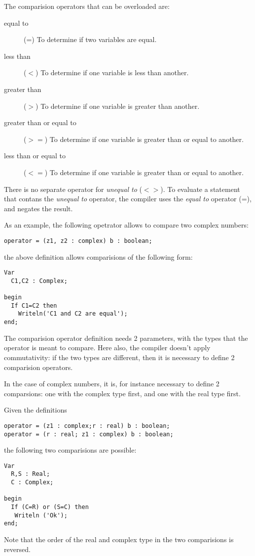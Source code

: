 The comparision operators that can be overloaded are:
\begin{description}
\item[equal to] (=) To determine if two variables are equal.
\item[less than] ($<$) To determine if one variable is less than another.
\item[greater than] ($>$) To determine if one variable is greater than another.
\item[greater than or equal to] ($>=$) To determine if one variable is greater than
or equal to another.
\item[less than or equal to] ($<=$) To determine if one variable is greater
than or equal to another.
\end{description}
There is no separate operator for {\em unequal to} ($<>$). To evaluate a
statement that contans the {\em unequal to} operator, the compiler uses the
{\em equal to} operator (=), and negates the result.


As an example, the following opetrator allows to compare two complex
numbers:
\begin{verbatim}
operator = (z1, z2 : complex) b : boolean;
\end{verbatim}
the above definition allows comparisions of the following form:
\begin{verbatim}
Var
  C1,C2 : Complex;

begin
  If C1=C2 then
    Writeln('C1 and C2 are equal');
end;
\end{verbatim}

The comparision operator definition needs 2 parameters, with the types that
the operator is meant to compare. Here also, the compiler doesn't apply
commutativity: if the two types are different, then it is necessary to
define 2 comparision operators.

In the case of complex numbers, it is, for instance necessary to define
2 comparsions: one with the complex type first, and one with the real type
first.

Given the definitions
\begin{verbatim}
operator = (z1 : complex;r : real) b : boolean;
operator = (r : real; z1 : complex) b : boolean;
\end{verbatim}
the following two comparisions are possible:
\begin{verbatim}
Var
  R,S : Real;
  C : Complex;

begin
  If (C=R) or (S=C) then
   Writeln ('Ok');
end;
\end{verbatim}
Note that the order of the real and complex type in the two comparisions
is reversed.

